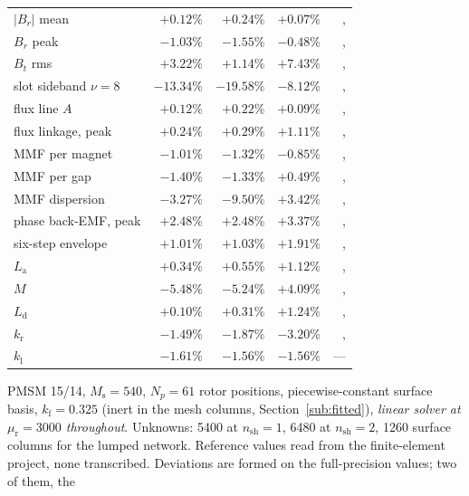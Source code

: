 \documentclass[10pt,a4paper,twocolumn]{article}
\theoremstyle{plain}
\theoremstyle{remark}
\begin{document}
\begin{table}[!t]
\begin{threeparttable}
\begin{tabular}{@{}lrrrr@{}}
$|B_r|$ mean                          & $+0.12\%$ & $+0.24\%$ & $+0.07\%$ &, \\
$B_r$ peak                            & $-1.03\%$ & $-1.55\%$ & $-0.48\%$ &, \\
$B_t$ rms                             & $+3.22\%$ & $+1.14\%$ & $+7.43\%$ &, \\
slot sideband $\nu=8$                 & $-13.34\%$& $-19.58\%$& $-8.12\%$ &, \\
flux line $A$                         & $+0.12\%$ & $+0.22\%$ & $+0.09\%$ &, \\
flux linkage, peak                    & $+0.24\%$ & $+0.29\%$ & $+1.11\%$ &, \\
MMF per magnet                        & $-1.01\%$ & $-1.32\%$ & $-0.85\%$ &, \\
MMF per gap                           & $-1.40\%$ & $-1.33\%$ & $+0.49\%$ &, \\
MMF dispersion                        & $-3.27\%$ & $-9.50\%$ & $+3.42\%$ &, \\
phase back-EMF, peak                  & $+2.48\%$ & $+2.48\%$ & $+3.37\%$ &, \\
six-step envelope                     & $+1.01\%$ & $+1.03\%$ & $+1.91\%$ &, \\
$L_{\mathrm{a}}$                      & $+0.34\%$ & $+0.55\%$ & $+1.12\%$ &, \\
$M$                                   & $-5.48\%$ & $-5.24\%$ & $+4.09\%$ &, \\
$L_{\mathrm{d}}$                      & $+0.10\%$ & $+0.31\%$ & $+1.24\%$ &, \\
$k_{\mathrm{r}}$                      & $-1.49\%$ & $-1.87\%$ & $-3.20\%$ &, \\
$k_{\mathrm{l}}$                      & $-1.61\%$ & $-1.56\%$ & $-1.56\%$ & ---\\
\bottomrule
\end{tabular}
\begin{tablenotes}[flushleft]\footnotesize
\item PMSM 15/14, $M_{\mathrm{s}}=540$, $N_p=61$ rotor positions,
piecewise-constant surface basis, $k_{\mathrm{f}}=\num{0.325}$ (inert in the mesh columns, Section~\ref{sub:fitted}),
\emph{linear solver at $\mu_{\mathrm{r}}=\num{3000}$ throughout}.
Unknowns: \num{5400} at $n_{\mathrm{sh}}=1$, \num{6480} at
$n_{\mathrm{sh}}=2$, \num{1260} surface columns for the lumped network.
Reference values read from the finite-element project, none transcribed.
Deviations are formed on the full-precision values; two of them, the

\end{tablenotes}
\end{threeparttable}
\end{table}
\end{document}

